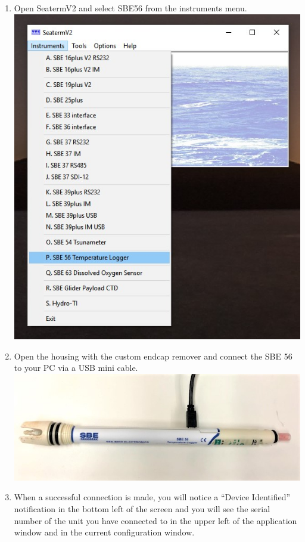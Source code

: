 \documentclass[]{book}
\providecommand{\tightlist}{%
  \setlength{\itemsep}{0pt}\setlength{\parskip}{0pt}}
\begin{document}
\begin{enumerate}
\def\labelenumi{\arabic{enumi}.}
\tightlist
\item
  Open SeatermV2 and select SBE56 from the instruments menu.
  \includegraphics{images/SBE56_program_step_1.jpg}
\item
  Open the housing with the custom endcap remover and connect the SBE 56 to your PC via a USB mini cable.
  \includegraphics{images/SBE56_connect.jpg}
\item
  When a successful connection is made, you will notice a ``Device Identified'' notification in the bottom left of the screen and you will see the serial number of the unit you have connected to in the upper left of the application window and in the current configuration window.

\end{enumerate}
\end{document}
